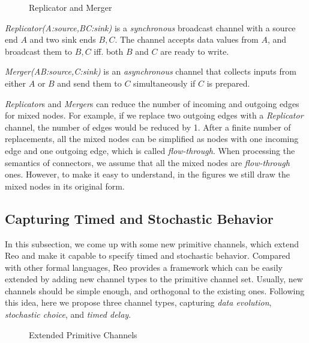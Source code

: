 \begin{figure}[H]
    \centering
    
    \caption{Replicator and Merger}
\end{figure}

\begin{description}
    \item \emph{Replicator(A:source,B\:C:sink)} is a \emph{synchronous} broadcast channel with a source end $A$ and two sink ends $B,C$. The channel accepts data values from $A$, and broadcast them to $B,C$ iff. both $B$ and $C$ are ready to write.
    \item \emph{Merger(A\:B:source,C:sink)}
    is an \emph{asynchronous} channel that collects inputs from either $A$ or $B$ and send them to $C$ simultaneously if $C$ is prepared.
\end{description}

\emph{Replicator}s and \emph{Merger}s can reduce the number of incoming and outgoing edges for mixed nodes. For example, if we replace two outgoing edges with a \emph{Replicator} channel, the number of edges would be reduced by 1. After a finite number of replacements, all the mixed nodes can be simplified as nodes with one incoming edge and one outgoing edge, which is called \emph{flow-through}.
When processing the semantics of connectors, we assume that all the mixed nodes are \emph{flow-through} ones. However, to make it easy to understand, in the figures we still draw the mixed nodes in its original form.

\subsection{Capturing Timed and Stochastic Behavior}

In this subsection, we come up with some new primitive channels, which extend Reo and make it capable to specify timed and stochastic behavior.
Compared with other formal languages, Reo provides a framework which can be easily extended by adding new channel types to the primitive channel set. Usually, new channels should be simple enough, and orthogonal to the existing ones. Following this idea, here we propose three channel types, capturing \emph{data evolution}, \emph{stochastic choice}, and \emph{timed delay}.

\begin{figure}[t]
    \centering
    \label{fig:newchannels}
    
    \caption{Extended Primitive Channels}
\end{figure}

